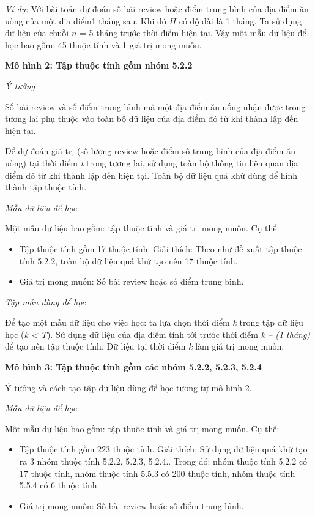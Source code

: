 \documentclass[12pt]{extarticle}
\begin{document}
			\par \textit{Ví dụ}: Với bài toán dự đoán số bài review hoặc điểm trung bình của địa điểm ăn uống của một địa điểm1 tháng sau. Khi đó $H$ có độ dài là 1 tháng. Ta sử dụng dữ liệu của chuỗi $n$ = 5 tháng trước thời điểm hiện tại. Vậy một mẫu dữ liệu để học bao gồm: 45 thuộc tính và 1 giá trị mong muốn.
			\par \textbf{Mô hình 2: Tập thuộc tính gồm nhóm 5.2.2}
			\par \textit{Ý tưởng}
			\par Số bài review và số điểm trung bình mà một địa điểm ăn uống nhận được trong tương lai phụ thuộc vào toàn bộ dữ liệu của địa điểm đó từ khi thành lập đến hiện tại.
			\par Để dự đoán giá trị (số lượng review hoặc điểm số trung bình của địa điểm ăn uống) tại thời điểm \textit{t} trong tương lai, sử dụng toàn bộ thông tin liên quan địa điểm đó từ khi thành lập đến hiện tại. Toàn bộ dữ liệu quá khứ dùng để hình thành tập thuộc tính.
			\par \textit{Mẫu dữ liệu để học}
				\par Một mẫu dữ liệu bao gồm: tập thuộc tính và giá trị mong muốn. Cụ thể:
				\begin{itemize}
					\item Tập thuộc tính gồm 17 thuộc tính. Giải thích: Theo như đề xuất tập thuộc tính 5.2.2, toàn bộ dữ liệu quá khứ tạo nên 17 thuộc tính.  
					\item Giá trị mong muốn: Số bài review hoặc số điểm trung bình.
				\end{itemize}
			\par \textit{Tập mẫu dùng để học}
			\par  Để tạo một mẫu dữ liệu cho việc học:  ta lựa chọn thời điểm \textit{k} trong tập dữ liệu học (\textit{k < T}). Sử dụng dữ liệu của địa điểm tính tới trước thời điểm \textit{k – (1 tháng)} để tạo nên tập thuộc tính. Dữ liệu tại thời điểm \textit{k} làm giá trị mong muốn. 
			\par \textbf{Mô hình 3: Tập thuộc tính gồm các nhóm 5.2.2, 5.2.3, 5.2.4}
			\par Ý tưởng và cách tạo tập dữ liệu dùng để học tương tự mô hình 2.
			\par \textit{Mẫu dữ liệu để học}
			\par Một mẫu dữ liệu bao gồm: tập thuộc tính và giá trị mong muốn. Cụ thể:
				\begin{itemize}
					\item Tập thuộc tính gồm 223 thuộc tính. Giải thích: Sử dụng dữ liệu quá khứ tạo ra 3 nhóm thuộc tính 5.2.2, 5.2.3, 5.2.4.. Trong đó: nhóm thuộc tính 5.2.2 có 17 thuộc tính, nhóm thuộc tính 5.5.3 có 200 thuộc tính, nhóm thuộc tính 5.5.4 có 6 thuộc tính. 
					\item Giá trị mong muốn: Số bài review hoặc số điểm trung bình.
				\end{itemize}
\end{document}
